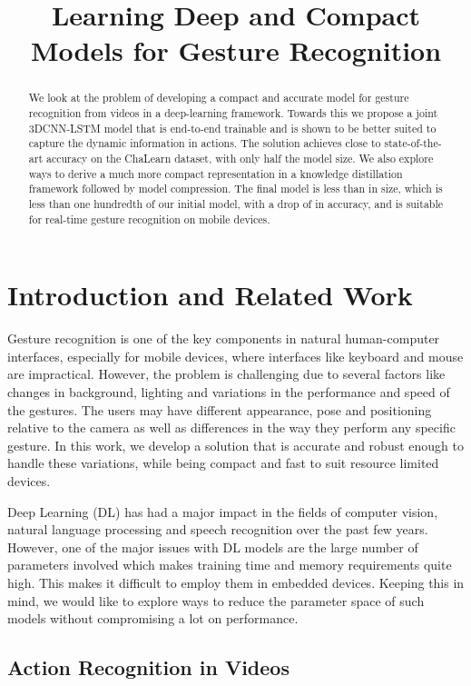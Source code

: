 \documentclass{article}
\title{Learning Deep and Compact Models for Gesture Recognition}
\begin{document}
\maketitle
\begin{abstract}
We look at the problem of developing a compact and accurate model for gesture recognition from videos
in a deep-learning framework. Towards this we propose a joint 3DCNN-LSTM model that is end-to-end
trainable and is shown to be better suited to capture the dynamic information in actions. The solution
achieves close to state-of-the-art accuracy on the ChaLearn dataset, with only half the model
size. We also explore ways to derive a much more compact representation in a knowledge distillation
framework followed by model compression.  The final model is less than  in size, which is less
than one hundredth of our initial model, with a drop of   in accuracy, and is suitable for real-time
gesture recognition on mobile devices.
\end{abstract}
\section{Introduction and Related Work}
\label{sec:intro}

Gesture recognition is one of the key components in natural human-computer interfaces, especially for mobile devices, where interfaces like keyboard and mouse are impractical. However, the problem is challenging due to several factors like changes in background, lighting and variations in the performance and speed of the gestures. The users may have different appearance, pose and positioning relative to the camera as well as differences in the way they perform any specific gesture. In this work, we develop a solution that is accurate and robust enough to handle these variations, while being compact and fast to suit resource limited devices.

Deep Learning (DL) has had a major impact in the fields of computer vision, natural language processing and speech recognition over the past few years. However, one of the major issues with DL models are the large number of parameters involved which makes training time and memory requirements quite high. This makes it difficult to employ them in embedded devices. Keeping this in mind, we would like to explore ways to reduce the parameter space of such models without compromising a lot on performance.

\subsection{Action Recognition in Videos}
\label{ssec:action}
\end{document}
